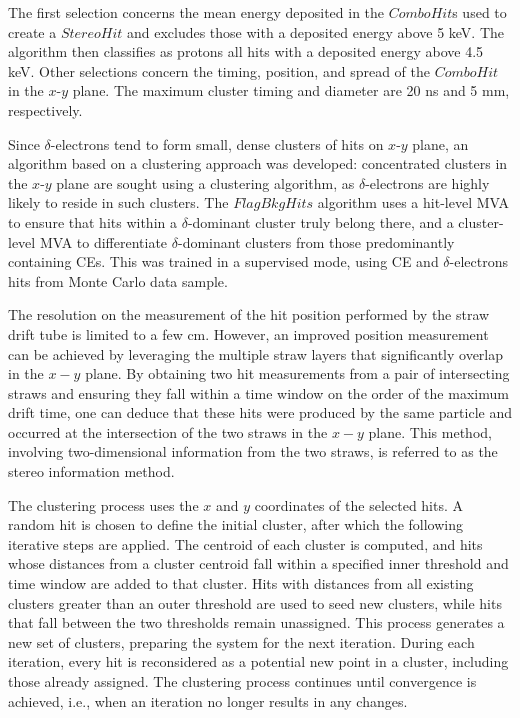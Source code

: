The first selection concerns the 
mean energy deposited in  
the $ComboHit$s used to create a 
$StereoHit$ and excludes 
those with a deposited energy above 5 keV. 
The algorithm then classifies as 
protons all hits with a deposited 
energy above 4.5 keV.
Other selections concern the timing, 
position, and spread of the $ComboHit$ 
in the $x$-$y$ plane. The maximum cluster timing 
and diameter are 20 ns and 5 mm, respectively.

Since $\delta$-electrons tend to form small, dense 
clusters of hits on $x$-$y$ plane, an algorithm based on a clustering 
approach was developed: concentrated clusters in the 
$x$-$y$ plane are sought using a clustering algorithm, 
as $\delta$-electrons are highly likely to reside 
in such clusters. The $FlagBkgHits$ algorithm uses  
a hit-level MVA to ensure that hits within a 
$\delta$-dominant cluster truly belong there, 
and a cluster-level MVA to differentiate 
$\delta$-dominant clusters from those 
predominantly containing CEs. 
This was trained in a supervised mode, 
using CE and $\delta$-electrons hits from 
Monte Carlo data sample.

The resolution on the measurement of the 
hit position performed by the straw drift 
tube is limited to a few cm. 
However, an improved position measurement can be 
achieved by leveraging the multiple straw layers that 
significantly overlap in the $x-y$ plane. 
By obtaining two hit measurements from a pair of 
intersecting straws and ensuring they fall within 
a time window on the order of the maximum drift time, 
one can deduce that these hits were produced by the 
same particle and occurred at the intersection of the 
two straws in the $x-y$ plane. This method, 
involving two-dimensional information from the two 
straws, is referred to as the stereo information method.

The clustering process uses the $x$ and $y$ coordinates 
of the selected hits. A random hit is chosen to define 
the initial cluster, after which the following iterative 
steps are applied. The centroid of each cluster is 
computed, and hits whose distances from a cluster 
centroid fall within a specified inner threshold 
and time window are added to that cluster. Hits 
with distances from all existing clusters greater 
than an outer threshold are used to seed new 
clusters, while hits that fall between the two 
thresholds remain unassigned. This process 
generates a new set of clusters, preparing the 
system for the next iteration. During each 
iteration, every hit is reconsidered as a 
potential new point in a cluster, including 
those already assigned. The clustering process 
continues until convergence is achieved, i.e., 
when an iteration no longer results in any changes.


